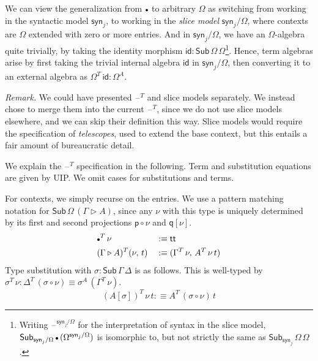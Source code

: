 \documentclass[12pt,a4paper,twoside,openany]{book}
\theoremstyle{remark}
\theoremstyle{definition}
\theoremstyle{theorem}
\newcommand{\id}{\mathsf{id}}
\newcommand{\Sub}{\mathsf{Sub}}
\renewcommand{\tt}{\mathsf{tt}}
\newcommand{\blank}{\mathord{\hspace{1pt}\text{--}\hspace{1pt}}}
\newcommand{\ext}{\triangleright}
\newcommand{\emptycon}{\scaleobj{.75}\bullet}
\newcommand{\p}{\mathsf{p}}
\newcommand{\q}{\mathsf{q}}
\newcommand{\syn}{\mathsf{syn}}
\newcommand{\defn}{:\equiv}
\begin{document}
We can view the generalization from $\emptycon$ to arbitrary $\Omega$ as
switching from working in the syntactic model $\syn_j$, to working in the
\emph{slice model} $\syn_j/\Omega$, where contexts are $\Omega$ extended with
zero or more entries. And in $\syn_j/\Omega$, we have an $\Omega$-algebra quite
trivially, by taking the identity morphism $\id :
\Sub\,\Omega\,\Omega$\footnote{Writing $\blank^{\syn_j/\Omega}$ for the interpretation
of syntax in the slice model,
$\Sub_{\syn_j/\Omega}\,\emptycon\,(\Omega^{\syn_j/\Omega})$ is isomorphic to, but not
strictly the same as $\Sub_{\syn_j}\,\Omega\,\Omega$.}. Hence, term algebras
arise by first taking the trivial internal algebra $\id$ in $\syn_j/\Omega$,
then converting it to an external algebra as $\Omega^T\,\id : \Omega^A$.

\emph{Remark.} We could have presented $\blank^T$ and slice models separately.
We instead chose to merge them into the current $\blank^T$, since we do not use
slice models elsewhere, and we can skip their definition this way. Slice models
would require the specification of \emph{telescopes}, used to extend the base
context, but this entails a fair amount of bureaucratic detail.

We explain the $\blank^T$ specification in the following. Term and substitution
equations are given by UIP. We omit cases for substitutions and terms.

For contexts, we simply recurse on the entries. We use a pattern matching
notation for $\Sub\,\Omega\,(\Gamma\ext A)$, since any $\nu$ with this type is
uniquely determined by its first and second projections $\p\circ\nu$ and
$\q[\nu]$.
\begin{alignat*}{3}
  &\emptycon^T\,\nu           &&\defn \tt\\
  &(\Gamma \ext A)^T(\nu,\,t) &&\defn (\Gamma^T\,\nu,\,A^T\,\nu\,t)
\end{alignat*}
Type substitution with $\sigma : \Sub\,\Gamma\,\Delta$ is as follows. This is well-typed by
$\sigma^T\,\nu : \Delta^T\,(\sigma \circ \nu) \equiv \sigma^A\,(\Gamma^T\,\nu)$.
\[ (A[\sigma])^T\,\nu\,t \defn A^T\,(\sigma\circ\nu)\,t \]
\end{document}
